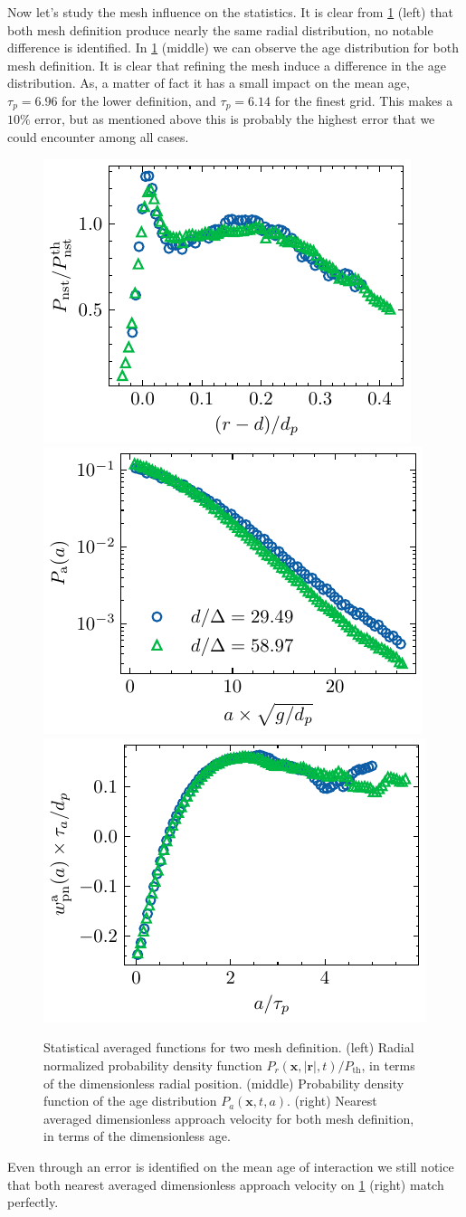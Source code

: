 Now let's study the mesh influence on the statistics. 
It is clear from \ref{fig:apstat} (left) that both mesh definition produce nearly the same radial distribution, no notable difference is identified. 
In \ref{fig:apstat} (middle) we can observe the age distribution for both mesh definition. 
It is clear that refining the mesh induce a difference in the age distribution. 
As, a matter of fact it has a small impact on the mean age, $\tau_p = 6.96$ for the lower definition, and $\tau_p = 6.14$ for the finest grid.
This makes a $10\%$ error, but as mentioned above this is probably the highest error that we could encounter among all cases. 
\begin{figure}
    \centering
    \includegraphics[height = 0.24\textwidth]{image/HOMOGENEOUS_NEW/VAL/Pr.pdf}
    \includegraphics[height = 0.24\textwidth]{image/HOMOGENEOUS_NEW/VAL/Pa.pdf}
    \includegraphics[height = 0.24\textwidth]{image/HOMOGENEOUS_NEW/VAL/w.pdf}
    \caption{
        Statistical averaged functions for two mesh definition. 
        (left) Radial normalized probability density function  $P_r(\textbf{x},|\textbf{r}|,t)/P_\text{th}$, in terms of the dimensionless radial position. 
        (middle) Probability density function of the age distribution $P_a(\textbf{x},t,a)$. 
        (right) Nearest averaged dimensionless approach velocity for both mesh definition, in terms of the dimensionless age. 
    }
    \label{fig:apstat}
\end{figure}
Even through an error is identified on the mean age of interaction we still notice that both nearest averaged dimensionless approach velocity on \ref{fig:apstat} (right) match perfectly. 
